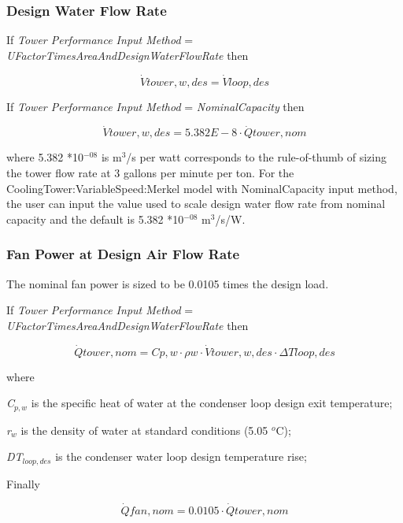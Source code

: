 \subsubsection{Design Water Flow Rate}\label{design-water-flow-rate}

If \emph{Tower Performance Input Method} = \emph{UFactorTimesAreaAndDesignWaterFlowRate} then

\begin{equation}
\dot Vtower,w,des = \dot Vloop,des
\end{equation}

If \emph{Tower Performance Input Method} = \emph{NominalCapacity} then

\begin{equation}
\dot Vtower,w,des = 5.382E - 8\cdot \dot Qtower,nom
\end{equation}

where 5.382 *10\(^{-08}\) is m\(^{3}\)/s per watt corresponds to the rule-of-thumb of sizing the tower flow rate at 3 gallons per minute per ton. For the CoolingTower:VariableSpeed:Merkel model with NominalCapacity input method, the user can input the value used to scale design water flow rate from nominal capacity and the default is 5.382 *10\(^{-08}\) m\(^{3}\)/s/W.

\subsubsection{Fan Power at Design Air Flow Rate}\label{fan-power-at-design-air-flow-rate}

The nominal fan power is sized to be 0.0105 times the design load.

If \emph{Tower Performance Input Method} = \emph{UFactorTimesAreaAndDesignWaterFlowRate} then

\begin{equation}
\dot Qtower,nom = Cp,w\cdot \rho w\cdot \dot Vtower,w,des\cdot \Delta Tloop,des
\end{equation}

where

\emph{C\(_{p,w}\)} is the specific heat of water at the condenser loop design exit temperature;

\emph{r\(_{w}\)} is the density of water at standard conditions (5.05 \(^{o}\)C);

\emph{DT\(_{loop,des}\)} is the condenser water loop design temperature rise;

Finally

\begin{equation}
\dot Qfan,nom = 0.0105\cdot \dot Qtower,nom
\end{equation}


